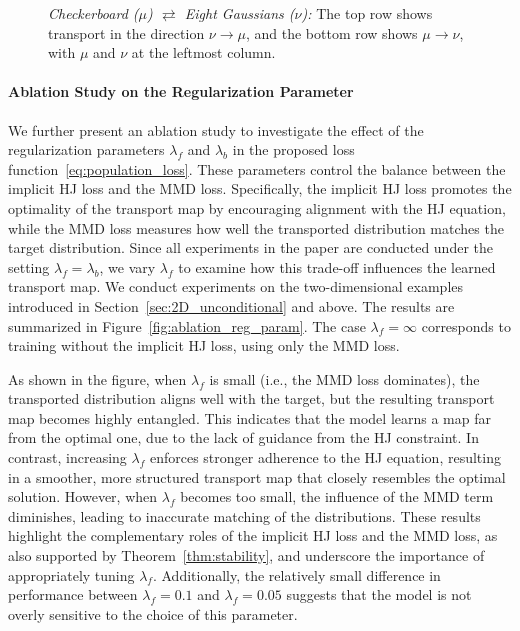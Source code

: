 \documentclass{article} %
\theoremstyle{plain}
\theoremstyle{definition}
\theoremstyle{remark}
\begin{document}
\begin{figure}[t]
    \caption{
        \textit{Checkerboard ($\mu$) $\rightleftarrows$ Eight Gaussians ($\nu$):} 
        The top row shows transport in the direction $\nu \rightarrow \mu$, and the bottom row shows $\mu \rightarrow \nu$, with $\mu$ and $\nu$ at the leftmost column.
    }
    \label{fig:2d_checkerboard_8gaussians}
\end{figure}
\paragraph{Ablation Study on the Regularization Parameter}
We further present an ablation study to investigate the effect of the regularization parameters \( \lambda_f \) and \( \lambda_b \) in the proposed loss function~\eqref{eq:population_loss}. These parameters control the balance between the implicit HJ loss and the MMD loss. Specifically, the implicit HJ loss promotes the optimality of the transport map by encouraging alignment with the HJ equation, while the MMD loss measures how well the transported distribution matches the target distribution. Since all experiments in the paper are conducted under the setting \( \lambda_f = \lambda_b \), we vary \( \lambda_f \) to examine how this trade-off influences the learned transport map.
We conduct experiments on the two-dimensional examples introduced in Section~\ref{sec:2D_unconditional} and above. The results are summarized in Figure~\ref{fig:ablation_reg_param}. The case \( \lambda_f = \infty \) corresponds to training without the implicit HJ loss, using only the MMD loss.

As shown in the figure, when \( \lambda_f \) is small (i.e., the MMD loss dominates), the transported distribution aligns well with the target, but the resulting transport map becomes highly entangled. This indicates that the model learns a map far from the optimal one, due to the lack of guidance from the HJ constraint. In contrast, increasing \( \lambda_f \) enforces stronger adherence to the HJ equation, resulting in a smoother, more structured transport map that closely resembles the optimal solution. However, when \( \lambda_f \) becomes too small, the influence of the MMD term diminishes, leading to inaccurate matching of the distributions.
These results highlight the complementary roles of the implicit HJ loss and the MMD loss, as also supported by Theorem~\ref{thm:stability}, and underscore the importance of appropriately tuning \( \lambda_f \). Additionally, the relatively small difference in performance between \( \lambda_f = 0.1 \) and \( \lambda_f = 0.05 \) suggests that the model is not overly sensitive to the choice of this parameter.
\end{document}
